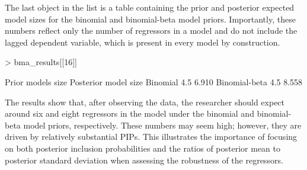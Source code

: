 \documentclass[a4paper]{article}
\begin{document}
The last object in the list is a table containing the prior and posterior expected model sizes for the binomial and binomial-beta model priors. Importantly, these numbers reflect only the number of regressors in a model and do not include the lagged dependent variable, which is present in every model by construction.
\begin{Schunk}
\begin{Sinput}
> bma_results[[16]]
\end{Sinput}
\begin{Soutput}
              Prior models size Posterior model size
Binomial                    4.5                6.910
Binomial-beta               4.5                8.558
\end{Soutput}
\end{Schunk}

The results show that, after observing the data, the researcher should expect around six and eight regressors in the model under the binomial and binomial-beta model priors, respectively. These numbers may seem high; however, they are driven by relatively substantial PIPs. This illustrates the importance of focusing on both posterior inclusion probabilities and the ratios of posterior mean to posterior standard deviation when assessing the robustness of the regressors.
\end{document}
